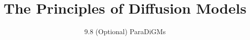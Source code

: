 
\title{The Principles of Diffusion Models}
\subtitle{9.8 (Optional) ParaDiGMs}


\begin{frame}
    \titlepage
\end{frame}


